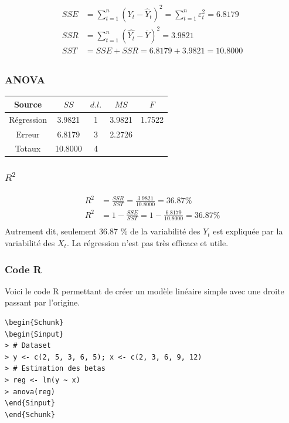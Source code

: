 \documentclass[11pt,french]{report}
\begin{document}
\begin{align*}
SSE &= \displaystyle\sum_{t=1}^n (Y_t - \hat{Y}_t)^2 = \displaystyle\sum_{t=1}^n \varepsilon_t^2 = 6.8179 \\
SSR &= \displaystyle\sum_{t=1}^n (\hat{Y_t} - \overline{Y})^2 = 3.9821 \\
SST &= SSE + SSR = 6.8179 +3.9821 = 10.8000 \\
\end{align*}

\subsubsection*{ANOVA}
\begin{center}
\begin{tabular}{|c|c|c|c|c|}
\hline
Source & $SS$ & $d.l.$ & $MS$ & $F$ \\
\hline
Régression & 3.9821 & 1 & 3.9821 & 1.7522 \\
Erreur & 6.8179 & 3 & 2.2726 & \\
\hline
Totaux & 10.8000 & 4 & & \\
\hline
\end{tabular}
\end{center}

\subsubsection*{$R^2$}
\begin{align*}
R^2 &= \frac{SSR}{SST} = \frac{3.9821}{10.8000} = 36.87 \% \\
R^2 &= 1 - \frac{SSE}{SST} = 1 - \frac{6.8179}{10.8000} = 36.87 \% \\
\end{align*}
Autrement dit, seulement 36.87 \% de la variabilité des $Y_t$ est expliquée par la variabilité des $X_t$. La régression n'est pas très efficace et utile.

\subsubsection*{Code R}
Voici le code R permettant de créer un modèle linéaire simple avec une droite passant par l'origine.

\begin{lstlisting}[linerange=\\begin\{Sinput\}-\\end\{Sinput\},includerangemarker=false, caption = Code source en R pour l'exemple]
\begin{Schunk}
\begin{Sinput}
> # Dataset
> y <- c(2, 5, 3, 6, 5); x <- c(2, 3, 6, 9, 12)
> # Estimation des betas
> reg <- lm(y ~ x)
> anova(reg)
\end{Sinput}
\end{Schunk}
\end{lstlisting}
\bigskip
\end{document}

